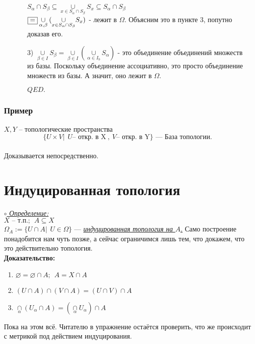 \documentclass[10pt]{report}
\begin{document}
\begin{spacing}{1.5}
\begin{enumerate}
\begin{enumerate}
\\ $S_{\alpha}\cap S_{\beta}\subseteq\underset{x\in S_{\alpha}\cap S_{\beta}}{\cup}S_{x}\subseteq S_{\alpha}\cap S_{\beta}$
\\ $\fbox{=}\underset{\alpha,\beta}{\cup}(\underset{x\in S_{\alpha}\cap S_{\beta}}{\cup}S_{x})$ - лежит в $\Omega$. Объясним это в пункте 3, попутно доказав его.
\item[3)] $\underset{\beta\in I}{\cup}S_{\beta} = \underset{\beta\in I}{\cup}(\underset{\alpha\in I_{b}}{\cup}S_{\alpha})$ - это объединение объединений множеств из базы. Поскольку объединение ассоциативно, это просто объединение множеств из базы. А значит, оно лежит в $\Omega$.
\begin{flushright}
$QED.$
\end{flushright}
\end{enumerate}
\end{enumerate}
\subsubsection{Пример}
$X, Y$ -- топологические пространства
\\ $$\lbrace U\times V |~~ U \text{-- откр. в X}~,~ V \text{-- откр. в Y}\rbrace \text{ --- База топологии.}$$
\\Доказывается непосредственно.
\section{Индуцированная топология}
\underline{\textit{$\circ$ Определение:}}\\
$X \text{ -- т.п.};~~A\subseteq X$
\\$\Omega_{A}:=\lbrace U\cap A |~~U\in \Omega\rbrace$ --- \underline{\textit{индуцированная топология на $A$.}}
Само построение понадобится нам чуть позже, а сейчас ограничимся лишь тем, что докажем, что это действительно топология.\\
\textbf{Доказательство:}
\begin{enumerate}
\item $\varnothing = \varnothing\cap A;~~A=X\cap A$
\item $(U\cap A)\cap(V\cap A)=(U\cap V)\cap A$
\item $\underset{\alpha}{\cap}(U_{\alpha}\cap A)=(\underset{\alpha}{\cap}U_{\alpha})\cap A$

\end{enumerate}
 Пока на этом всё. Читателю в упражнение остаётся проверить, что же происходит с метрикой под действием индуцирования.

\end{spacing}
\end{document}

